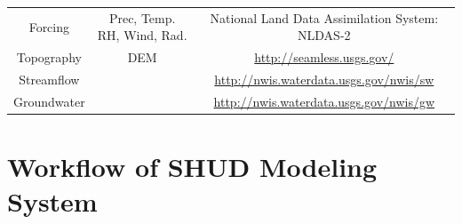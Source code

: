 \documentclass[]{scrbook}
\begin{document}
\begin{longtable}[]{@{}ccc@{}}
\begin{minipage}[t]{0.11\columnwidth}
Forcing\strut
\end{minipage} & \begin{minipage}[t]{0.19\columnwidth}\centering\strut
Prec, Temp. RH, Wind, Rad.\strut
\end{minipage} & \begin{minipage}[t]{0.42\columnwidth}\centering\strut
National Land Data Assimilation System: NLDAS-2\strut
\end{minipage}\tabularnewline
\begin{minipage}[t]{0.11\columnwidth}\centering\strut
Topography\strut
\end{minipage} & \begin{minipage}[t]{0.19\columnwidth}\centering\strut
DEM\strut
\end{minipage} & \begin{minipage}[t]{0.42\columnwidth}\centering\strut
\url{http://seamless.usgs.gov/}\strut
\end{minipage}\tabularnewline
\begin{minipage}[t]{0.11\columnwidth}\centering\strut
Streamflow\strut
\end{minipage} & \begin{minipage}[t]{0.19\columnwidth}\centering\strut
\strut
\end{minipage} & \begin{minipage}[t]{0.42\columnwidth}\centering\strut
\url{http://nwis.waterdata.usgs.gov/nwis/sw}\strut
\end{minipage}\tabularnewline
\begin{minipage}[t]{0.11\columnwidth}\centering\strut
Groundwater\strut
\end{minipage} & \begin{minipage}[t]{0.19\columnwidth}\centering\strut
\strut
\end{minipage} & \begin{minipage}[t]{0.42\columnwidth}\centering\strut
\url{http://nwis.waterdata.usgs.gov/nwis/gw}\strut
\end{minipage}\tabularnewline
\bottomrule
\end{longtable}

\section{Workflow of SHUD Modeling
System}\label{workflow-of-shud-modeling-system}
\end{document}
